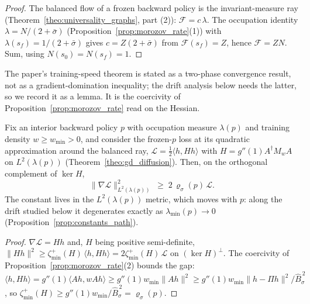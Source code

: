 \begin{proof}
The balanced flow of a frozen backward policy is the invariant-measure ray
(Theorem~\ref{theo:universality_graphs}, part (2)): $\mathcal F = c\,\lambda$. The
occupation identity $\lambda = N/(2+\bar\sigma)$
(Proposition~\ref{prop:morozov_rate}(1)) with $\lambda(s_f)=1/(2+\bar\sigma)$ gives
$c = Z(2+\bar\sigma)$ from $\mathcal F(s_f)=Z$, hence $\mathcal F = Z N$. Sum, using
$N(s_0)=N(s_f)=1$.
\end{proof}

The paper's training-speed theorem is stated as a two-phase convergence result, not as
a gradient-domination inequality; the drift analysis below needs the latter, so we
record it as a lemma. It is the coercivity of Proposition~\ref{prop:morozov_rate} read
on the Hessian.

\begin{lemma}\label{lem:local_pl}
Fix an interior backward policy $p$ with occupation measure $\lambda(p)$ and training
density $w\geq w_{\min}>0$, and consider the frozen-$p$ loss at its quadratic
approximation around the balanced ray, $\mathcal L=\tfrac12\langle h,Hh\rangle$ with
$H=g''(1)A^\dagger M_wA$ on $L^2(\lambda(p))$ (Theorem~\ref{theo:gd_diffusion}). Then,
on the orthogonal complement of $\ker H$,
\begin{equation*}
    \|\nabla\mathcal L\|^2_{L^2(\lambda(p))}\;\geq\;2\,\varrho_\sigma(p)\,\mathcal L .
\end{equation*}
The constant lives in the $L^2(\lambda(p))$ metric, which moves with $p$: along the
drift studied below it degenerates exactly as $\lambda_{\min}(p)\to0$
(Proposition~\ref{prop:constants_path}).
\end{lemma}

\begin{proof}
$\nabla\mathcal L=Hh$ and, $H$ being positive semi-definite,
$\|Hh\|^2\geq\zeta^+_{\min}(H)\,\langle h,Hh\rangle=2\zeta^+_{\min}(H)\,\mathcal L$
on $(\ker H)^\perp$. The coercivity of Proposition~\ref{prop:morozov_rate}(2) bounds the
gap: $\langle h,Hh\rangle=g''(1)\langle Ah,wAh\rangle\geq
g''(1)w_{\min}\|Ah\|^2\geq g''(1)w_{\min}\|h-\Pi h\|^2/\widehat B_\sigma^{\,2}$, so
$\zeta^+_{\min}(H)\geq g''(1)w_{\min}/\widehat B_\sigma^{\,2}=\varrho_\sigma(p)$.
\end{proof}

